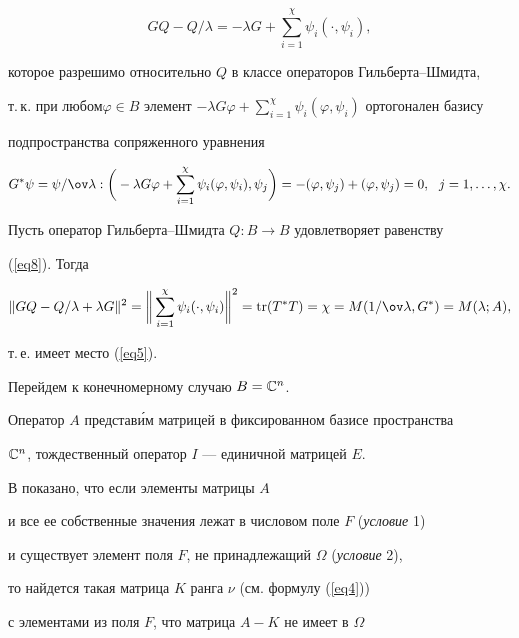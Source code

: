 \begin{pf}
\begin{equation}
GQ-Q/\lambda= -\lambda G+\sum_{i=1}^\chi\psi_i(\cdot,\psi_i),


\end{equation}


которое разрешимо относительно $Q$ в классе операторов Гильберта--Шмидта,


т.\,к. при любом\linebreak $\varphi\in B$ элемент $-\lambda G\varphi+


\sum\limits_{i=1}^\chi\psi_i(\varphi,\psi_i)$ ортогонален базису 


подпространства сопряженного уравнения 


$$


G^*\psi=\psi/\ov\lambda:


\bigg(-\lambda G\varphi+\sum_{i=1}^\chi\psi_i(\varphi,\psi_i),\psi_j\bigg)=


-(\varphi,\psi_j)+(\varphi,\psi_j)=0,\ \ j=1,\dotsc,\chi.


$$


Пусть оператор Гильберта--Шмидта $Q:B\to B$ удовлетворяет равенству


(\ref{eq8}). Тогда


$$


\|GQ-Q/\lambda+\lambda G\|^2=\bigg\|


\sum_{i=1}^\chi\psi_i(\cdot,\psi_i)\bigg\|^2=


\tr (T^*T)=\chi=M(1/\ov\lambda,G^*)=M(\lambda;A),


$$


т.\,е. имеет место (\ref{eq5}).


\end{pf}





Перейдем к конечномерному случаю $B=\Bbb C^n$.


Оператор $A$ представ\'им матрицей в фиксированном базисе пространства


$\Bbb C^n$, тождественный оператор $I$ --- единичной матрицей $E$.


В \cite{b3} показано, что если элементы матрицы $A$ 


и все ее собственные значения лежат в числовом поле $F$ ({\it условие} 1) 


и существует элемент поля $F$, не принадлежащий $\Omega$ ({\it условие} 2), 


то найдется такая матрица $K$ ранга $\nu$ (см. формулу (\ref{eq4})) 


с элементами из поля $F$, что матрица $A - K$ не имеет в $\Omega$ 


